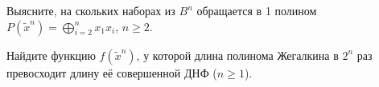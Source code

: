 \documentclass[12pt, a4paper]{article}
\begin{document}
\begin{problemList}
\medskip

{Выясните, на скольких наборах из $B^n$ обращается в 1 полином $P(\tilde x^n)=\bigoplus\limits_{i=2}^n x_1x_i$, $n \ge 2$.}

\medskip

{Найдите функцию $f(\tilde x^n)$, у которой длина полинома Жегалкина в $2^n$ раз превосходит длину её совершенной ДНФ ($n \ge 1$).}

\bigskip

\end{problemList}
\end{document}
